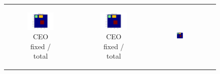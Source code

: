 \documentclass{article}
\begin{document}
\begin{figure}[!h]
  \centering
  \begin{tabular}[c]{c|c|c|c}
    \begin{subfigure}[c]{0.35\textwidth}
      \includegraphics[width=\textwidth]{images/grid-t0-x0.png}
      \caption{CEO fixed / total}
      \label{fig:ceoa}
    \end{subfigure}&
    \begin{subfigure}[c]{0.35\textwidth}
      \includegraphics[width=\textwidth]{images/grid-t0-x0.png}
      \caption{CEO fixed / total}
      \label{fig:ceob}
    \end{subfigure}&
    \begin{subfigure}[c]{0.35\textwidth}
      \includegraphics[width=\textwidth]{images/grid-t0-x0.png}

\end{subfigure}
\end{tabular}
\end{figure}
\end{document}
